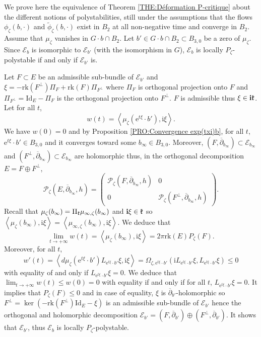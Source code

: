 \documentclass{article}
\theoremstyle{remark}
\theoremstyle{definition}
\newcommand{\rk}{\mathrm{rk}}
\newcommand{\Id}{\mathrm{Id}}
\renewcommand{\i}{\boldsymbol{\mathrm{i}}}
\newcommand{\e}{\boldsymbol{\mathrm{e}}}
\newcommand{\scal}[2]{\left< #1,#2 \right>}
\newcommand{\E}{\mathcal{E}}
\newcommand{\mP}{\mathcal{P}}
\newcommand{\dbar}{\overline{\partial}}
\renewcommand{\leq}{\leqslant}
\begin{document}
We prove here the equivalence of Theorem \ref{THE:Déformation P-critique} about the different notions of polystabilities, still under the assumptions that the flows $\phi_\zeta(b,\cdot)$ and $\tilde{\phi}_\zeta(b,\cdot)$ exist in $B_2$ at all non-negative time and converge in $B_2$.\\

\noindent{} Assume that $\mu_\zeta$ vanishes in $G \cdot b \cap B_2$. Let $b' \in G \cdot b \cap B_2 \subset B_{3,0}$ be a zero of $\mu_\zeta$. Since $\E_b$ is isomorphic to $\E_{b'}$ (with the isomorphism in $G$), $\E_b$ is locally $P_\zeta$-polystable if and only if $\E_{b'}$ is.

Let $F \subset E$ be an admissible sub-bundle of $\E_{b'}$ and $\xi = -\rk(F^\bot)\Pi_F + \rk(F)\Pi_{F^\bot}$ where $\Pi_F$ is orthogonal projection onto $F$ and $\Pi_{F^\bot} = \Id_E - \Pi_F$ is the orthogonal projection onto $F^\bot$. $F$ is admissible thus $\xi \in \i\frak{k}$. Let for all $t$,
$$
w(t) = \scal{\mu_\zeta(\e^{t\xi} \cdot b')}{\i\xi}.
$$
We have $w(0) = 0$ and by Proposition \ref{PRO:Convergence exp(txi)b}, for all $t$, $\e^{t\xi} \cdot b' \in B_{3,0}$ and it converges toward some $b_\infty \in B_{3,0}$. Moreover, $(F,\dbar_{b_\infty}) \subset \E_{b_\infty}$ and $(F^\bot,\dbar_{b_\infty}) \subset \E_{b_\infty}$ are holomorphic thus, in the orthogonal decomposition $E = F \oplus F^\bot$,
$$
\mP_\zeta(E,\dbar_{b_\infty},h) =
\begin{pmatrix}
    \mP_\zeta(F,\dbar_{b_\infty},h) & 0\\
    0 & \mP_\zeta(F^\bot,\dbar_{b_\infty},h)
\end{pmatrix}.
$$
Recall that $\mu_\zeta(b_\infty) = \Pi_{\frak{k}}\mu_{\infty,\zeta}(b_\infty)$ and $\i\xi \in \frak{k}$ so $\scal{\mu_\zeta(b_\infty)}{\i\xi} = \scal{\mu_{\infty,\zeta}(b_\infty)}{\i\xi}$. We deduce that
$$
\lim_{t \rightarrow +\infty} w(t) = \scal{\mu_\zeta(b_\infty)}{\i\xi} = 2\pi\rk(E)P_\zeta(F).
$$
Moreover, for all $t$,
$$
w'(t) = \scal{d\mu_\zeta(\e^{t\xi} \cdot b')L_{\e^{t\xi} \cdot b'}\xi}{\i\xi} = \Omega_{\zeta,\e^{t\xi} \cdot b'}(\i L_{\e^{t\xi} \cdot b'}\xi,L_{\e^{t\xi} \cdot b'}\xi) \leq 0
$$
with equality of and only if $L_{\e^{t\xi} \cdot b'}\xi = 0$. We deduce that $\lim_{t \rightarrow +\infty} w(t) \leq w(0) = 0$ with equality if and only if for all $t$, $L_{\e^{t\xi} \cdot b'}\xi = 0$. It implies that $P_\zeta(F) \leq 0$ and in case of equality, $\xi$ is $\dbar_{b'}$-holomorphic so $F^\bot = \ker(-\rk(F^\bot)\Id_E - \xi)$ is an admissible sub-bundle of $\E_{b'}$ hence the orthogonal and holomorphic decomposition $\E_{b'} = (F,\dbar_{b'}) \oplus (F^\bot,\dbar_{b'})$. It shows that $\E_{b'}$, thus $\E_b$ is locally $P_\zeta$-polystable.\\
\end{document}
